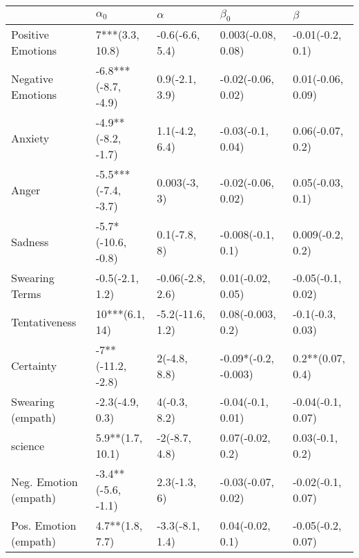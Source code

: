 \begin{tabular}{lllll}
\toprule
{} &           $\alpha_0$ &          $\alpha$ &             $\beta_0$ &            $\beta$ \\
\midrule
Positive Emotions     &      7***(3.3, 10.8) &   -0.6(-6.6, 5.4) &    0.003(-0.08, 0.08) &   -0.01(-0.2, 0.1) \\
Negative Emotions     &  -6.8***(-8.7, -4.9) &    0.9(-2.1, 3.9) &    -0.02(-0.06, 0.02) &  0.01(-0.06, 0.09) \\
Anxiety               &   -4.9**(-8.2, -1.7) &    1.1(-4.2, 6.4) &     -0.03(-0.1, 0.04) &   0.06(-0.07, 0.2) \\
Anger                 &  -5.5***(-7.4, -3.7) &      0.003(-3, 3) &    -0.02(-0.06, 0.02) &   0.05(-0.03, 0.1) \\
Sadness               &   -5.7*(-10.6, -0.8) &      0.1(-7.8, 8) &     -0.008(-0.1, 0.1) &   0.009(-0.2, 0.2) \\
Swearing Terms        &      -0.5(-2.1, 1.2) &  -0.06(-2.8, 2.6) &     0.01(-0.02, 0.05) &  -0.05(-0.1, 0.02) \\
Tentativeness         &       10***(6.1, 14) &  -5.2(-11.6, 1.2) &     0.08(-0.003, 0.2) &   -0.1(-0.3, 0.03) \\
Certainty             &    -7**(-11.2, -2.8) &      2(-4.8, 8.8) &  -0.09*(-0.2, -0.003) &   0.2**(0.07, 0.4) \\
Swearing (empath)     &      -2.3(-4.9, 0.3) &      4(-0.3, 8.2) &     -0.04(-0.1, 0.01) &  -0.04(-0.1, 0.07) \\
science               &     5.9**(1.7, 10.1) &     -2(-8.7, 4.8) &      0.07(-0.02, 0.2) &    0.03(-0.1, 0.2) \\
Neg. Emotion (empath) &   -3.4**(-5.6, -1.1) &      2.3(-1.3, 6) &    -0.03(-0.07, 0.02) &  -0.02(-0.1, 0.07) \\
Pos. Emotion (empath) &      4.7**(1.8, 7.7) &   -3.3(-8.1, 1.4) &      0.04(-0.02, 0.1) &  -0.05(-0.2, 0.07) \\
\bottomrule
\end{tabular}
